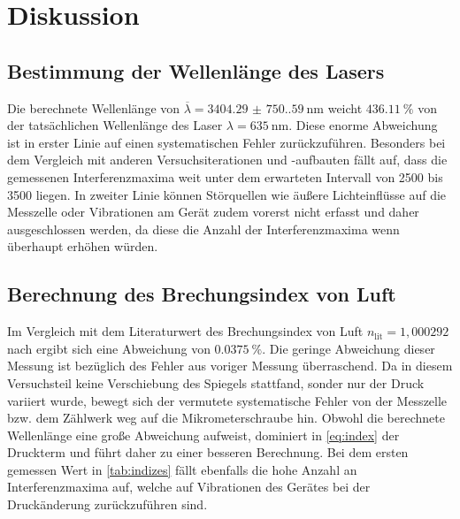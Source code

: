 \section{Diskussion}
\label{sec:Diskussion}

\subsection{Bestimmung der Wellenlänge des Lasers}

Die berechnete Wellenlänge von $\overline{\lambda} = \qty{3404.29(750.59)}{\nano\meter}$
weicht $\qty{436.11}{\percent}$ von der tatsächlichen Wellenlänge des Laser $\lambda = \qty{635}{\nano\meter}$.
Diese enorme Abweichung ist in erster Linie auf einen systematischen Fehler zurückzuführen.
Besonders bei dem Vergleich mit anderen Versuchsiterationen und -aufbauten fällt auf, 
dass die gemessenen Interferenzmaxima weit unter dem erwarteten Intervall von 2500 bis 3500 liegen.
In zweiter Linie können Störquellen wie äußere Lichteinflüsse auf die Messzelle oder Vibrationen am Gerät
zudem vorerst nicht erfasst und daher ausgeschlossen werden,
da diese die Anzahl der Interferenzmaxima wenn überhaupt erhöhen würden.


\subsection{Berechnung des Brechungsindex von Luft}

Im Vergleich mit dem Literaturwert des Brechungsindex von Luft $n_\text{lit} = 	1,000292$ nach \cite{brechungsindex}
ergibt sich eine Abweichung von $\qty{0.0375}{\percent}$. 
Die geringe Abweichung dieser Messung ist bezüglich des Fehler aus voriger Messung überraschend.
Da in diesem Versuchsteil keine Verschiebung des Spiegels stattfand, sonder nur der Druck variiert wurde,
bewegt sich der vermutete systematische Fehler von der Messzelle bzw. dem Zählwerk weg auf die Mikrometerschraube hin.
Obwohl die berechnete Wellenlänge eine große Abweichung aufweist, dominiert in \autoref{eq:index} der Druckterm
und führt daher zu einer besseren Berechnung. 
Bei dem ersten gemessen Wert in \autoref{tab:indizes} fällt ebenfalls die hohe Anzahl an Interferenzmaxima auf,
welche auf Vibrationen des Gerätes bei der Druckänderung zurückzuführen sind.